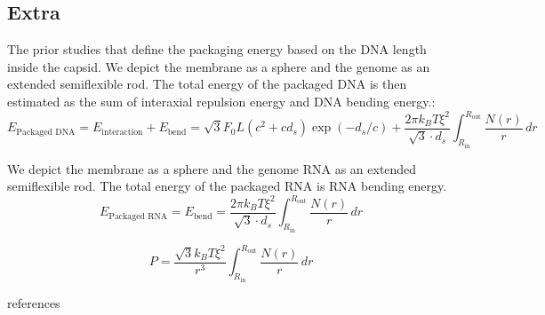 \documentclass[12pt]{article}
\begin{document}
\begin{flushleft}
\subsection*{Extra}
The prior studies that define the packaging energy based on the DNA length inside the capsid. We depict the membrane as a sphere and the genome as an extended semiflexible rod. The total energy of the packaged DNA is then estimated as the sum of interaxial repulsion energy and DNA bending energy.\cite{Grayson2006}:
\begin{equation}
E_{\text{Packaged DNA}} = E_{\text{interaction}} + E_{\text{bend}} = \sqrt{3} F_0 L (c^2 + c d_s) \exp(-d_s / c)
+ \frac{2 \pi k_B T \xi^2}{\sqrt{3} \cdot d_s} \int_{R_{\text{in}}}^{R_{\text{out}}} \frac{N(r)}{r} \, dr
\end{equation}

\end{flushleft}



We depict the membrane as a sphere and the genome RNA as an extended semiflexible rod. The total energy of the packaged RNA is RNA bending energy.
\begin{equation}
E_{\text{Packaged RNA}} =  E_{\text{bend}} = \frac{2 \pi k_B T \xi^2}{\sqrt{3} \cdot d_s} \int_{R_{\text{in}}}^{R_{\text{out}}} \frac{N(r)}{r} \, dr
\end{equation}

\begin{equation}
P= \frac{\sqrt{3} k_B T \xi^2}{ r^3} \int_{R_{\text{in}}}^{R_{\text{out}}} \frac{N(r)}{r} \, dr
\end{equation}

\newpage




 {references}  
\end{document}

